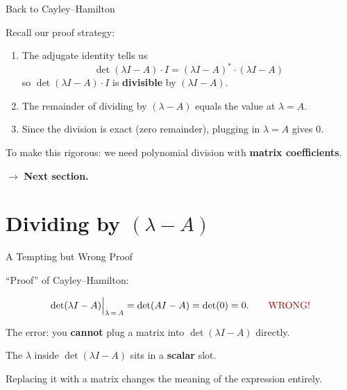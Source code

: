 \documentclass[10pt]{beamer}
\theoremstyle{definition}
\newcommand{\x}[1]{\alert{\textbf{#1}}}
\newcommand{\rd}[1]{{\color{red!70!black}#1}}
\begin{document}
\begin{frame}{Back to Cayley--Hamilton}

\vfill

Recall our proof strategy:

\vfill

\begin{enumerate}
\item The adjugate identity tells us
$$\det(\lambda I - A) \cdot I = (\lambda I - A)^{*} \cdot (\lambda I - A)$$
so $\det(\lambda I - A) \cdot I$ is \x{divisible} by $(\lambda I - A)$.

\vfill

\item The remainder of dividing by $(\lambda - A)$ equals the value at $\lambda = A$.

\vfill

\item Since the division is exact (zero remainder), plugging in $\lambda = A$ gives $0$.
\end{enumerate}

\vfill

To make this rigorous:
we need polynomial division with \x{matrix coefficients}.

\vfill
$\to$ \x{Next section.}

\vfill
\end{frame}



\section{Dividing by $(\lambda - A)$}


\begin{frame}{A Tempting but \rd{Wrong} Proof}

\vfill

``Proof'' of Cayley--Hamilton:

$$\det(\lambda I - A)\Big|_{\lambda\,=\,A} = \det(AI - A) = \det(0) = 0. \qquad \rd{\text{WRONG!}}$$

\vfill

The error: you \x{cannot} plug a matrix into $\det(\lambda I - A)$ directly.

\vfill

The $\lambda$ inside $\det(\lambda I - A)$ sits in a \x{scalar} slot.

Replacing it with a matrix changes the meaning of the expression entirely.

\vfill
\end{frame}
\end{document}
